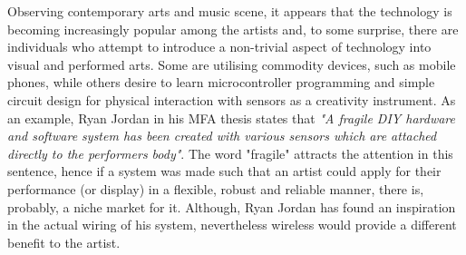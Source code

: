  Observing contemporary arts and music scene, it appears that
 the technology is becoming increasingly popular among the artists
 and, to some surprise, there are individuals who attempt to
 introduce a non-trivial aspect of technology into visual and
 performed arts. Some are utilising commodity devices, such
 as mobile phones, while others desire to learn microcontroller
 programming and simple circuit design for physical interaction
 with sensors as a creativity instrument.
  As an example, Ryan Jordan in his MFA thesis \cite{paper:ryan09}
 states that \emph{"A fragile DIY hardware and software system has
 been created with various sensors which are attached directly to
 the performers body"}. The word "fragile" attracts the attention
 in this sentence, hence if a system was made such that an artist
 could apply for their performance (or display) in a flexible,
 robust and reliable manner, there is, probably, a niche market
 for it. Although, Ryan Jordan has found an inspiration in the
 actual wiring of his system, nevertheless wireless would provide
 a different benefit to the artist.

